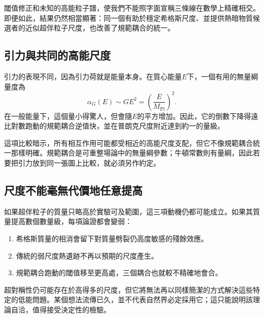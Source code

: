 閾值修正和未知的高能粒子譜，使我們不能照字面宣稱三條線在數學上精確相交。即便如此，結果仍然相當顯著：同一個有助於穩定希格斯尺度、並提供熱暗物質候選者的近似超伴粒子尺度，也改善了規範耦合的統一。

\subsection{引力與共同的高能尺度}

引力的表現不同，因為引力荷就是能量本身。在質心能量\(E\)下，一個有用的無量綱量度為
\begin{equation}
\alpha_G(E)\sim GE^2
=\left(\frac{E}{M_{\mathrm{Pl}}}\right)^2.
\end{equation}
在一般能量下，這個量小得驚人，但會隨\(E\)的平方增加。因此，它的倒數下降得遠比對數跑動的規範耦合逆值快，並在普朗克尺度附近達到約一的量級。

這項比較暗示，所有相互作用可能都受相近的高能尺度支配，但它不像規範耦合統一那樣明確。規範耦合是可重整場論中的無量綱參數；牛頓常數則有量綱，因此若要把引力放到同一張圖上比較，就必須另作約定。

\begin{classroomqa}
\end{classroomqa}

\begin{classroomqa}
\end{classroomqa}

\subsection{尺度不能毫無代價地任意提高}

如果超伴粒子的質量只略高於實驗可及範圍，這三項動機仍都可能成立。如果其質量提高數個數量級，每項論證都會變弱：
\begin{enumerate}
\item 希格斯質量的相消會留下對質量劈裂仍高度敏感的殘餘效應。
\item 傳統的弱尺度熱遺跡不再以預期的尺度產生。
\item 規範耦合跑動的閾值移至更高處，三個耦合也就較不精確地會合。
\end{enumerate}
超對稱性仍可能存在於高得多的尺度，但它將無法再以同樣簡潔的方式解決這些特定的低能問題。某個想法流傳已久，並不代表自然界必定採用它；這只能說明該理論自洽，值得接受決定性的檢驗。

